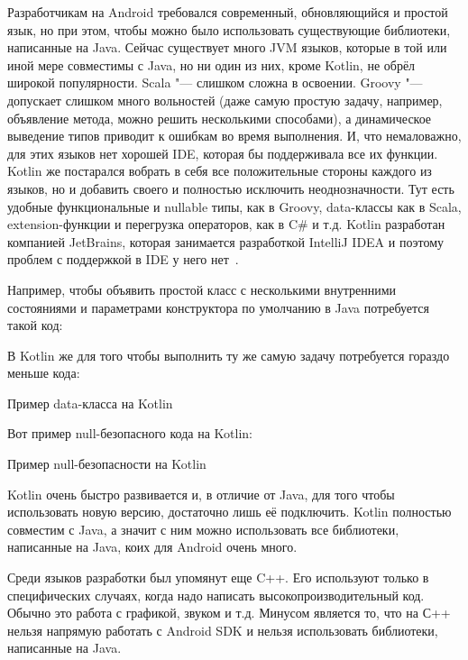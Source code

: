 Разработчикам на Android требовался современный, обновляющийся и простой язык, но при этом, чтобы можно было использовать существующие библиотеки, написанные на Java.
Сейчас существует много JVM языков, которые в той или иной мере совместимы с Java, но ни один из них, кроме Kotlin, не обрёл широкой популярности.
Scala "--- слишком сложна в освоении.
Groovy "--- допускает слишком много вольностей (даже самую простую задачу, например, объявление метода, можно решить несколькими способами), а динамическое выведение типов приводит к ошибкам во время выполнения.
И, что немаловажно, для этих языков нет хорошей IDE, которая бы поддерживала все их функции.
Kotlin же постарался вобрать в себя все положительные стороны каждого из языков, но и добавить своего и полностью исключить неоднозначности.
Тут есть удобные функциональные и nullable типы, как в Groovy, data-классы как в Scala, extension-функции и перегрузка операторов, как в C\# и т.д.
Kotlin разработан компанией JetBrains, которая занимается разработкой IntelliJ IDEA и поэтому проблем с поддержкой в IDE у него нет~\cite{kotlin:features}.

Например, чтобы объявить простой класс с несколькими внутренними состояниями и параметрами конструктора по умолчанию в Java потребуется такой код:\\

\begingroup
\endgroup

В Kotlin же для того чтобы выполнить ту же самую задачу потребуется гораздо меньше кода:

\begin{listing}[H]
  \caption{Пример data-класса на Kotlin}
  \label{lst:studentKt}
\end{listing}

Вот пример null-безопасного кода на Kotlin:

\begin{listing}[H]
  \caption{Пример null-безопасности на Kotlin}
  \label{lst:nullKt}
\end{listing}

Kotlin очень быстро развивается и, в отличие от Java, для того чтобы использовать новую версию, достаточно лишь её подключить.
Kotlin полностью совместим с Java, а значит с ним можно использовать все библиотеки, написанные на Java, коих для Android очень много.

Среди языков разработки был упомянут еще C++.
Его используют только в специфических случаях, когда надо написать высокопроизводительный код.
Обычно это работа с графикой, звуком и т.д.
Минусом является то, что на С++ нельзя напрямую работать с Android SDK и нельзя использовать библиотеки, написанные на Java.

